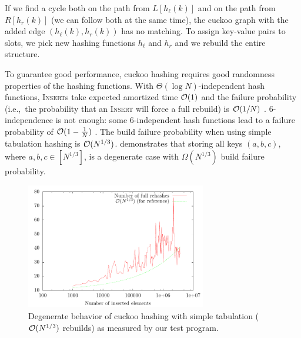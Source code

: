 If we find a cycle both on the path from $L[h_\ell(k)]$ and on the path from
$R[h_r(k)]$ (we can follow both at the same time), the cuckoo graph with
the added edge $(h_\ell(k),h_r(k))$ has no matching. To assign key-value pairs
to slots, we pick new hashing functions $h_\ell$ and $h_r$ and we rebuild
the entire structure.

To guarantee good performance, cuckoo hashing requires good randomness
properties of the hashing functions.
With $\Theta(\log N)$-independent hash functions, \textsc{Insert}s take
expected amortized time $\mathcal{O}(1)$ and the failure probability (i.e.,\ the
probability that an \textsc{Insert} will force a full rebuild) is
$\mathcal{O}(1/N)$ \cite{cuckoo-hashing}.
6-independence is not enough: some 6-independent hash functions lead to a
failure probability of $\mathcal{O}(1-\frac{1}{N})$ \cite{cuckoo-hashing-indep-bounds}.
The build failure probability when using simple tabulation hashing is
$\mathcal{O}(N^{1/3})$. \cite{power-of-simple-tab} demonstrates that storing all keys
$(a,b,c)$, where $a,b,c\in[N^{1/3}]$, is a degenerate case with
$\Omega(N^{1/3})$ build failure probability.

\begin{figure}
	\centering
	\includegraphics[width=0.7\textwidth]{img/cuckoo/results}
	\caption{Degenerate behavior of cuckoo hashing
		with simple tabulation ($\mathcal{O}(N^{1/3})$ rebuilds)
		as measured by our test program.}
\end{figure}

